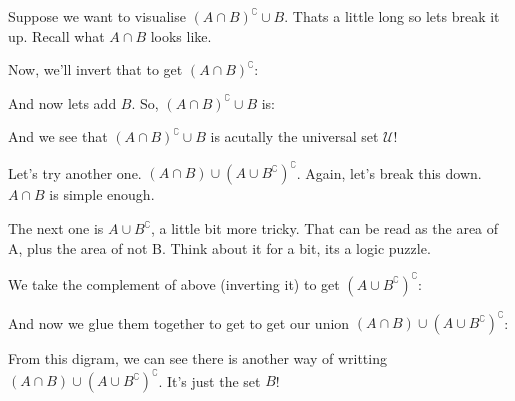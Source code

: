 \begin{boxexample}{}{}
	Suppose we want to visualise $(A \cap B)^\complement \cup B$. Thats a little long so lets break it up. Recall what $A \cap B$ looks like.

	\begin{venndiagram2sets}[shade=skyblue,labelNotAB={$\mathcal{U}$}]
		\fillACapB
	\end{venndiagram2sets}

	Now, we'll invert that to get $(A \cap B)^\complement$:

	\begin{venndiagram2sets}[shade=skyblue,labelNotAB={$\mathcal{U}$}]
		\fillNotAorNotB
	\end{venndiagram2sets}

	And now lets add $B$. So, $(A \cap B)^\complement \cup B$ is:

	\begin{venndiagram2sets}[shade=skyblue,labelNotAB={$\mathcal{U}$}]
		\fillAll
	\end{venndiagram2sets}

	And we see that $(A \cap B)^\complement \cup B$ is acutally the universal set $\mathcal{U}$!
\end{boxexample}

\begin{boxexample}{}{}
	Let's try another one. $(A \cap B) \cup (A \cup B^\complement)^\complement$. Again, let's break this down. $A \cap B$ is simple enough.

	\begin{venndiagram2sets}[shade=skyblue,labelNotAB={$\mathcal{U}$}]
		\fillACapB
	\end{venndiagram2sets}

	The next one is $A \cup B^\complement$, a little bit more tricky. That can be read as the area of A, plus the area of not B. Think about it for a bit, its a logic puzzle.
	\begin{venndiagram2sets}[shade=skyblue,labelNotAB={$\mathcal{U}$}]
		\fillA \fillNotAorB
	\end{venndiagram2sets}

	We take the complement of above (inverting it) to get $(A \cup B^\complement)^\complement$:

	\begin{venndiagram2sets}[shade=skyblue,labelNotAB={$\mathcal{U}$}]
		\fillOnlyB
	\end{venndiagram2sets}

	And now we glue them together to get to get our union $(A \cap B) \cup (A \cup B^\complement)^\complement$:

	\begin{venndiagram2sets}[shade=skyblue,labelNotAB={$\mathcal{U}$}]
		\fillB
	\end{venndiagram2sets}

	From this digram, we can see there is another way of writting $(A \cap B) \cup (A \cup B^\complement)^\complement$. It's just the set $B$!
\end{boxexample}


